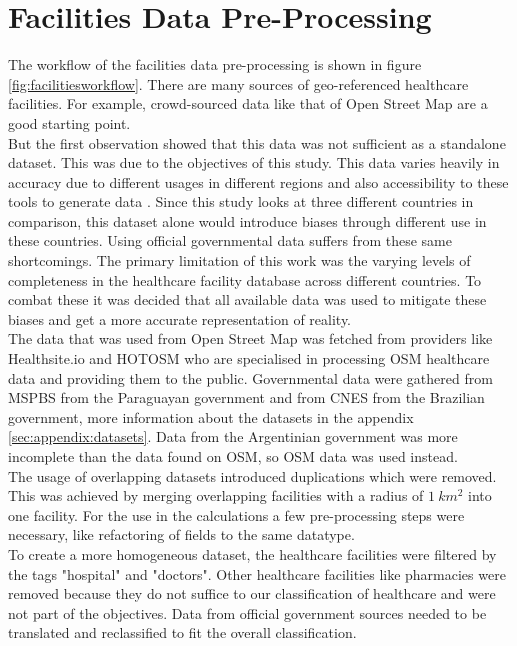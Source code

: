 \documentclass[11pt, a4paper]{report}
\begin{document}
\section{Facilities Data Pre-Processing}\label{sec:method:healthcaredist}
The workflow of the facilities data pre-processing is shown in figure \ref{fig:facilitiesworkflow}. There are many sources of geo-referenced healthcare facilities. For example, crowd-sourced data like that of Open Street Map are a good starting point. \\
%
But the first observation showed that this data was not sufficient as a standalone dataset. This was due to the objectives of this study. This data varies heavily in accuracy due to different usages in different regions and also accessibility to these tools to generate data \citep{haklay_how_2010}. Since this study looks at three different countries in comparison, this dataset alone would introduce biases through different use in these countries. Using official governmental data suffers from these same shortcomings. The primary limitation of this work was the varying levels of completeness in the healthcare facility database across different countries. To combat these it was decided that all available data was used to mitigate these biases and get a more accurate representation of reality. \\
%
The data that was used from Open Street Map was fetched from providers like Healthsite.io and  HOTOSM who are specialised in processing OSM healthcare data and providing them to the public. Governmental data were gathered from MSPBS from the Paraguayan government and from CNES from the Brazilian government, more information about the datasets in the appendix \ref{sec:appendix:datasets}. Data from the Argentinian government was more incomplete than the data found on OSM, so OSM data was used instead. \\
%
The usage of overlapping datasets introduced duplications which were removed. This was achieved by merging overlapping facilities with a radius of  $1 \ km^2$ into one facility. 
For the use in the calculations a few pre-processing steps were necessary, like refactoring of fields to the same datatype. \\
%
To create a more homogeneous dataset, the healthcare facilities were filtered by the tags "hospital" and "doctors". Other healthcare facilities like pharmacies were removed because they do not suffice to our classification of healthcare and were not part of the objectives. Data from official government sources needed to be translated and reclassified to fit the overall classification. 
\end{document}
